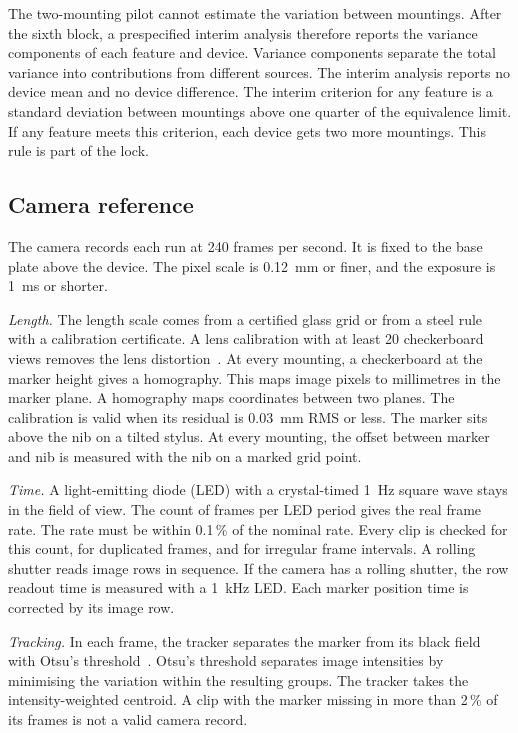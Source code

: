 The two-mounting pilot cannot estimate the variation between mountings.
After the sixth block, a prespecified interim analysis therefore reports the variance components of each feature and device.
Variance components separate the total variance into contributions from different sources.
The interim analysis reports no device mean and no device difference.
The interim criterion for any feature is a standard deviation between mountings above one quarter of the equivalence limit.
If any feature meets this criterion, each device gets two more mountings.
This rule is part of the lock.

\subsection{Camera reference}
\label{sec:camera}
The camera records each run at 240 frames per second.
It is fixed to the base plate above the device.
The pixel scale is 0.12~mm or finer, and the exposure is 1~ms or shorter.

\emph{Length.}
The length scale comes from a certified glass grid or from a steel rule with a calibration certificate.
A lens calibration with at least 20 checkerboard views removes the lens distortion~\cite{Zhang2000}.
At every mounting, a checkerboard at the marker height gives a homography.
This maps image pixels to millimetres in the marker plane.
A homography maps coordinates between two planes.
The calibration is valid when its residual is 0.03~mm RMS or less.
The marker sits above the nib on a tilted stylus.
At every mounting, the offset between marker and nib is measured with the nib on a marked grid point.

\emph{Time.}
A light-emitting diode (LED) with a crystal-timed 1~Hz square wave stays in the field of view.
The count of frames per LED period gives the real frame rate.
The rate must be within 0.1\,\% of the nominal rate.
Every clip is checked for this count, for duplicated frames, and for irregular frame intervals.
A rolling shutter reads image rows in sequence.
If the camera has a rolling shutter, the row readout time is measured with a 1~kHz LED.
Each marker position time is corrected by its image row.

\emph{Tracking.}
In each frame, the tracker separates the marker from its black field with Otsu's threshold~\cite{Otsu1979}.
Otsu's threshold separates image intensities by minimising the variation within the resulting groups.
The tracker takes the intensity-weighted centroid.
A clip with the marker missing in more than 2\,\% of its frames is not a valid camera record.

